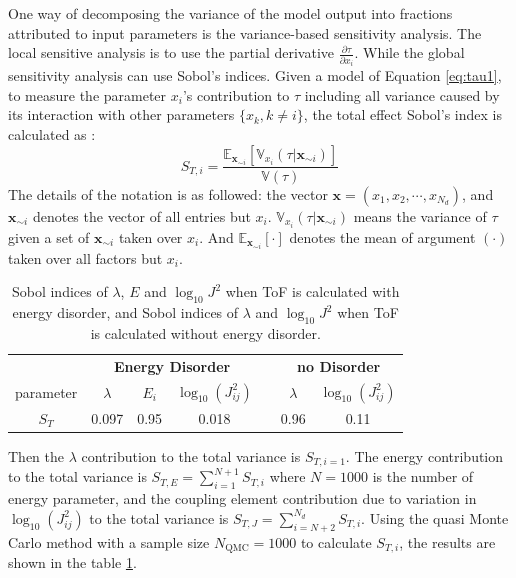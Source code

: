 \documentclass[%
 reprint,
superscriptaddress,
 amsmath,amssymb,
 aps,
prb,
floatfix
]{revtex4-2}
\begin{document}
One way of decomposing the variance of the model output into fractions attributed to input parameters is the variance-based sensitivity analysis. The local sensitive analysis is to use the partial derivative $\frac{\partial \tau}{\partial x_i}$. While the global sensitivity analysis can use Sobol's indices. Given a model of Equation \ref{eq:tau1}, to measure the parameter $x_i$'s contribution to $\tau$ including all variance caused by its interaction with other parameters $\{x_k, k \neq i \}$, the total effect Sobol's index is calculated as \cite{saltelli_variance_2010}:
\begin{equation}
    S_{T,i} = \frac{ \mathbb{E}_{\mathbf{x}_{\sim i}}[ \mathbb{V}_{x_i}(\tau|\mathbf{x}_{\sim i}) ] }{ \mathbb{V}(\tau) }
    \label{eq:STi}
\end{equation}
The details of the notation is as followed: the vector $\mathbf{x}=(x_1, x_2, \cdots, x_{N_d})$, and $\mathbf{x}_{\sim i}$ denotes the vector of all entries but $x_i$. 
$\mathbb{V}_{x_i}(\tau|\mathbf{x}_{\sim i})$ means the variance of $\tau$ given a set of $\mathbf{x}_{\sim i}$ taken over $x_i$. And $ \mathbb{E}_{\mathbf{x}_{\sim i}}[\cdot]$ denotes the mean of argument $(\cdot)$ taken over all factors but $x_i$.

%
\begin{table}[tbp]%
\caption{\label{tab:Sobol}%
Sobol indices of $\lambda$, $E$ and $\log_{10} J^2$ when ToF is calculated with energy disorder, and Sobol indices of $\lambda$ and $\log_{10} J^2$ when ToF is calculated without energy disorder.
}
\begin{ruledtabular}
  \begin{center}
    \begin{tabular}{c c c c c c c} %
      &  \multicolumn{3}{c}{\bf Energy Disorder} & &\multicolumn{2}{c}{\bf no Disorder}\\\cline{2-4}  \cline{6-7}
      parameter  & $\lambda$ & $ E_i$ & $ \log_{10}(J_{ij}^2)$ && $\lambda$ & $ \log_{10}(J_{ij}^2)$ \\ \hline
   $S_T$  & 0.097 & 0.95 & 0.018 && 0.96 & 0.11 \\
    \end{tabular}
  \end{center}
\end{ruledtabular}
\end{table}
%
Then the $\lambda$ contribution to the total variance is $S_{T,i=1}$.
The energy contribution to the total variance is $S_{T,E} = \sum\limits_{i=1}^{N+1} S_{T,i}$ where $N=1000$ is the number of energy parameter, and the coupling element contribution due to variation in $\log_{10}(J_{ij}^2)$ to the total variance is $S_{T,J}=\sum\limits_{i=N+2}^{N_d} S_{T,i}$. 
Using the quasi Monte Carlo method\cite{sobol_global_2001} with a sample size $N_\text{QMC}=1000$ to calculate $S_{T,i}$, the results are shown in the table \ref{tab:Sobol}.
\end{document}
